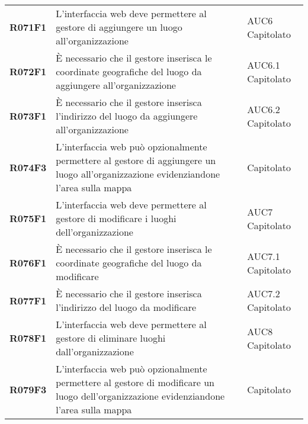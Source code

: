 \documentclass[../analisi-dei-requisiti.tex]{subfiles}
\begin{document}
\begin{longtable}[H]{>{\centering\bfseries}m{3cm} >{\centering}m{10cm} >{\centering\arraybackslash}m{3cm}}
  R071F1                               & L'interfaccia web deve permettere al gestore di aggiungere un luogo all'organizzazione                                                                                                                  & AUC6 Capitolato               \\
  R072F1                               & È necessario che il gestore inserisca le coordinate geografiche del luogo da aggiungere all'organizzazione                                                                                              & AUC6.1 Capitolato             \\
  R073F1                               & È necessario che il gestore inserisca l'indirizzo del luogo da aggiungere all'organizzazione                                                                                                            & AUC6.2 Capitolato             \\
  R074F3                               & L'interfaccia web può opzionalmente permettere al gestore di aggiungere un luogo all'organizzazione evidenziandone l'area sulla mappa                                                                   & Capitolato                    \\
  R075F1                               & L'interfaccia web deve permettere al gestore di modificare i luoghi dell'organizzazione                                                                                                                 & AUC7 Capitolato               \\
  R076F1                               & È necessario che il gestore inserisca le coordinate geografiche del luogo da modificare                                                                                                                 & AUC7.1 Capitolato             \\
  R077F1                               & È necessario che il gestore inserisca l'indirizzo del luogo da modificare                                                                                                                               & AUC7.2 Capitolato             \\
  R078F1                               & L'interfaccia web deve permettere al gestore di eliminare luoghi dall'organizzazione                                                                                                                    & AUC8 Capitolato               \\
  R079F3                               & L'interfaccia web può opzionalmente permettere al gestore di modificare un luogo dell'organizzazione evidenziandone l'area sulla mappa                                                                  & Capitolato                    \\

\end{longtable}
\end{document}
